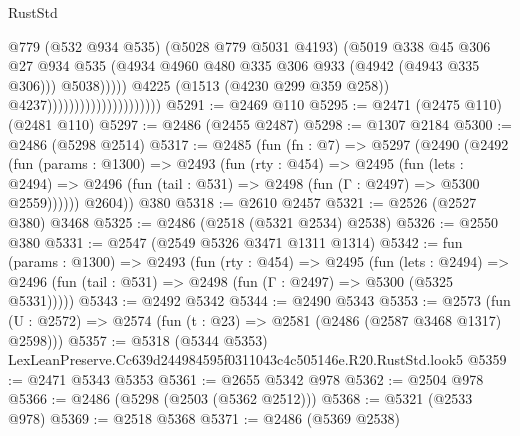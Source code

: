 \begin{lexlean}{RustStd}
\begin{coremodule}
                                                      @779
                                                      (@532 @934 @535)
                                                      (@5028 @779 @5031 @4193)
                                                      (@5019
                                                        @338
                                                        @45
                                                        @306
                                                        @27
                                                        @934
                                                        @535
                                                        (@4934
                                                          @4960
                                                          @480
                                                          @335
                                                          @306
                                                          @933
                                                          (@4942 (@4943 @335 @306)))
                                                        @5038)))))
                                              @4225
                                              (@1513 (@4230 @299 @359 @258))
                                              @4237)))))))))))))))))))))
@5291 := @2469 @110
@5295 := @2471 (@2475 @110) (@2481 @110)
@5297 := @2486 (@2455 @2487)
@5298 := @1307 @2184
@5300 := @2486 (@5298 @2514)
@5317 := @2485
    (fun (fn : @7) =>
    @5297
      (@2490
        (@2492
          (fun (params : @1300) =>
          @2493
            (fun (rty : @454) =>
            @2495
              (fun (lets : @2494) =>
              @2496 (fun (tail : @531) => @2498 (fun (Γ : @2497) => @5300 @2559))))))
        @2604))
    @380
@5318 := @2610 @2457
@5321 := @2526 (@2527 @380) @3468
@5325 := @2486 (@2518 (@5321 @2534) @2538)
@5326 := @2550 @380
@5331 := @2547 (@2549 @5326 @3471 @1311 @1314)
@5342 := fun (params : @1300) =>
  @2493
    (fun (rty : @454) =>
    @2495
      (fun (lets : @2494) =>
      @2496 (fun (tail : @531) => @2498 (fun (Γ : @2497) => @5300 (@5325 @5331)))))
@5343 := @2492 @5342
@5344 := @2490 @5343
@5353 := @2573 (fun (U : @2572) => @2574 (fun (t : @23) => @2581 (@2486 (@2587 @3468 @1317) @2598)))
@5357 := @5318 (@5344 @5353) LexLeanPreserve.Cc639d244984595f0311043c4c505146e.R20.RustStd.look5
@5359 := @2471 @5343 @5353
@5361 := @2655 @5342 @978
@5362 := @2504 @978
@5366 := @2486 (@5298 (@2503 (@5362 @2512)))
@5368 := @5321 (@2533 @978)
@5369 := @2518 @5368
@5371 := @2486 (@5369 @2538)

\end{coremodule}
\end{lexlean}
